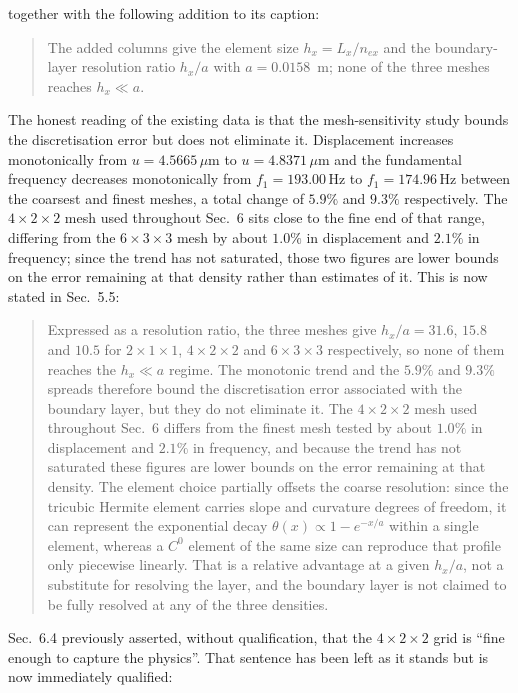 \documentclass[12pt,a4paper]{article}
\begin{document}
\noindent together with the following addition to its caption:

\begin{quote}\small
The added columns give the element size $h_x=L_x/n_{ex}$ and the boundary-layer resolution ratio $h_x/a$ with $a=0.0158$~m; none of the three meshes reaches $h_x\ll a$.
\end{quote}

The honest reading of the existing data is that the mesh-sensitivity study bounds the discretisation error but does not eliminate it. Displacement increases monotonically from $u=4.5665$\,$\mu$m to $u=4.8371$\,$\mu$m and the fundamental frequency decreases monotonically from $f_1=193.00$\,Hz to $f_1=174.96$\,Hz between the coarsest and finest meshes, a total change of $5.9\%$ and $9.3\%$ respectively. The $4\times2\times2$ mesh used throughout Sec.~6 sits close to the fine end of that range, differing from the $6\times3\times3$ mesh by about $1.0\%$ in displacement and $2.1\%$ in frequency; since the trend has not saturated, those two figures are lower bounds on the error remaining at that density rather than estimates of it. This is now stated in Sec.~5.5:

\begin{quote}\small
Expressed as a resolution ratio, the three meshes give
$h_{x}/a=31.6$, $15.8$ and $10.5$ for $2\times1\times1$, $4\times2\times2$
and $6\times3\times3$ respectively, so none of them reaches the
$h_{x}\ll a$ regime. The monotonic trend and the $5.9\%$ and $9.3\%$
spreads therefore bound the discretisation error associated with the
boundary layer, but they do not eliminate it. The $4\times2\times2$ mesh
used throughout Sec.~6 differs from the finest
mesh tested by about $1.0\%$ in displacement and $2.1\%$ in frequency,
and because the trend has not saturated these figures are lower bounds on
the error remaining at that density. The element choice partially offsets
the coarse resolution: since the tricubic Hermite element carries slope
and curvature degrees of freedom, it can represent the exponential decay
$\theta(x)\propto1-e^{-x/a}$ within a single element, whereas a $C^{0}$
element of the same size can reproduce that profile only piecewise
linearly. That is a relative advantage at a given $h_{x}/a$, not a
substitute for resolving the layer, and the boundary layer is not claimed
to be fully resolved at any of the three densities.
\end{quote}

\noindent Sec.~6.4 previously asserted, without qualification, that the $4\times2\times2$ grid is ``fine enough to capture the physics''. That sentence has been left as it stands but is now immediately qualified:
\end{document}

